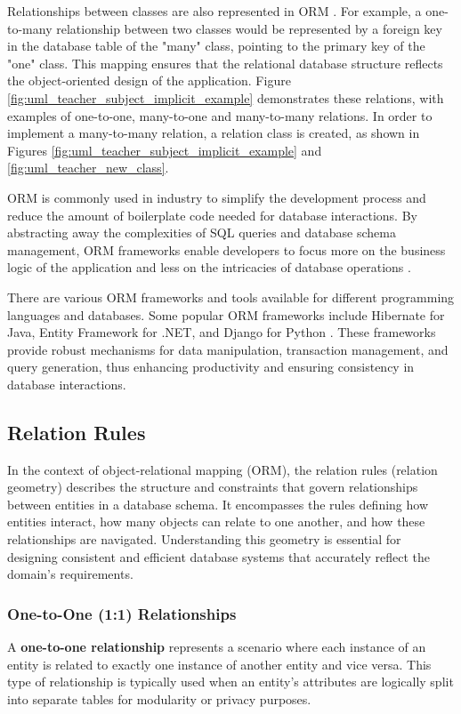 Relationships between classes are also represented in ORM \cite{fowler2003patterns}. For example, a one-to-many relationship between two classes would be represented by a foreign key in the database table of the "many" class, pointing to the primary key of the "one" class. This mapping ensures that the relational database structure reflects the object-oriented design of the application. Figure \ref{fig:uml_teacher_subject_implicit_example} demonstrates these relations, with examples of one-to-one, many-to-one and many-to-many relations. In order to implement a many-to-many relation, a relation class is created, as shown in Figures \ref{fig:uml_teacher_subject_implicit_example} and \ref{fig:uml_teacher_new_class}.



ORM is commonly used in industry to simplify the development process and reduce the amount of boilerplate code needed for database interactions. By abstracting away the complexities of SQL queries and database schema management, ORM frameworks enable developers to focus more on the business logic of the application and less on the intricacies of database operations \cite{larman2004applying}.


There are various ORM frameworks and tools available for different programming languages and databases. Some popular ORM frameworks include Hibernate for Java, Entity Framework for .NET, and Django for Python \cite{bernstein2009object}. These frameworks provide robust mechanisms for data manipulation, transaction management, and query generation, thus enhancing productivity and ensuring consistency in database interactions.

\subsection{Relation Rules} \label{sec:relation_rules}

In the context of object-relational mapping (ORM), the relation rules (relation geometry) describes the structure and constraints that govern relationships between entities in a database schema. It encompasses the rules defining how entities interact, how many objects can relate to one another, and how these relationships are navigated. Understanding this geometry is essential for designing consistent and efficient database systems that accurately reflect the domain's requirements.

\subsubsection{One-to-One (1:1) Relationships}
 A \textbf{one-to-one relationship} represents a scenario where each instance of an entity is related to exactly one instance of another entity and vice versa. This type of relationship is typically used when an entity's attributes are logically split into separate tables for modularity or privacy purposes.


